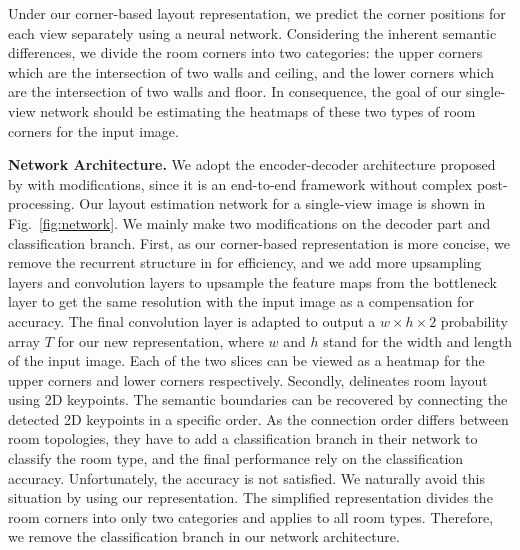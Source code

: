 %
 
 
Under our corner-based layout representation, we predict the corner positions for each view separately using a neural network. 
Considering the inherent semantic differences, we divide the room corners into two categories: the upper corners which are the intersection of two walls and ceiling, and the lower corners which are the intersection of two walls and floor. 
In consequence, the goal of our single-view network should be estimating the heatmaps of these two types of room corners for the input image.

\noindent\textbf{Network Architecture.}
We adopt the encoder-decoder architecture proposed by \cite{LeeRoomNet17} with modifications, since it is an end-to-end framework without complex post-processing. 
%
Our layout estimation network for a single-view image is shown in Fig.~\ref{fig:network}. 
We mainly make two modifications on the decoder part and classification branch. 
First, as our corner-based representation is more concise, we remove the recurrent structure in \cite{LeeRoomNet17} for efficiency, and we add more upsampling layers and convolution layers to upsample the feature maps from the bottleneck layer to get the same resolution with the input image as a compensation for accuracy. 
The final convolution layer is adapted to output a $w \times h \times 2$ probability array $T$ for our new representation, where $w$ and $h$ stand for the width and length of the input image. 
Each of the two slices can be viewed as a heatmap for the upper corners and lower corners respectively. 
Secondly, \cite{LeeRoomNet17} delineates room layout using 2D keypoints. The semantic boundaries can be recovered by connecting the detected 2D keypoints in a specific order. 
As the connection order differs between room topologies, they have to add a classification branch in their network to classify the room type, and the final performance rely on the classification accuracy. 
Unfortunately, the accuracy is not satisfied. 
We naturally avoid this situation by using our representation. The simplified representation divides the room corners into only two categories and applies to all room types. 
Therefore, we remove the classification branch in our network architecture.
 
